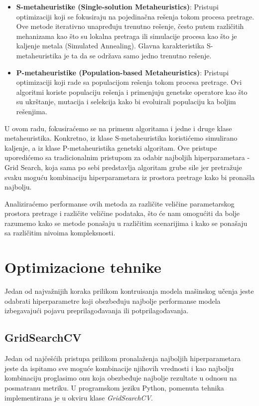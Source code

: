 \documentclass{article}
\begin{document}
\begin{itemize}
    \item \textbf{S-metaheuristike (Single-solution Metaheuristics)}: Pristupi optimizaciji koji se fokusiraju na pojedinačna rešenja tokom procesa pretrage. Ove metode iterativno unapređuju trenutno rešenje, često putem različitih mehanizama kao što su lokalna pretraga ili simulacije procesa kao što je kaljenje metala (Simulated Annealing). Glavna karakteristika S-metaheuristika je ta da se održava samo jedno trenutno rešenje.

    \item \textbf{P-metaheuristike (Population-based Metaheuristics)}: Pristupi optimizaciji koji rade sa populacijom rešenja tokom procesa pretrage. Ovi algoritmi koriste populaciju rešenja i primenjuju genetske operatore kao što su ukrštanje, mutacija i selekcija kako bi evoluirali populaciju ka boljim rešenjima.
\end{itemize}

\noindent U ovom radu, fokusiraćemo se na primenu algoritama i jedne i druge klase metaheuristika. Konkretno, iz klase S-metaheuristika koristićemo simulirano kaljenje, a iz klase P-metaheuristika genetski algoritam. Ove pristupe uporedićemo sa tradicionalnim pristupom za odabir najboljih hiperparametara - Grid Search, koja sama po sebi predstavlja algoritam grube sile jer pretražuje svaku moguću kombinaciju hiperparametara iz prostora pretrage kako bi pronašla najbolju.\newline

\noindent Analiziraćemo performanse ovih metoda za različite veličine parametarskog prostora pretrage i različite veličine podataka, što će nam omogućiti da bolje razumemo kako se metode ponašaju u različitim scenarijima i kako se ponašaju sa različitim nivoima kompleksnosti.

\newpage

\section{Optimizacione tehnike}
\vspace{0.5 cm}
Jedan od najvažnijih koraka prilikom kontruisanja modela mašinskog učenja jeste odabrati hiperparametre koji obezbeđuju najbolje performanse modela izbegavajući pojavu preprilagođavanja ili potprilagođavanja.
\subsection{GridSearchCV}
\vspace{0.25 cm}
Jedan od najčešćih pristupa prilikom pronalaženja najboljih hiperparametara jeste da ispitamo sve moguće kombinacije njihovih vrednosti i kao najbolju kombinaciju proglasimo onu koja obezbeđuje najbolje rezultate u odnosu na posmatranu metriku. U programskom jeziku Python, pomenuta tehnika implementirana je u okviru klase \textit{GridSearchCV}. \newline
\end{document}

